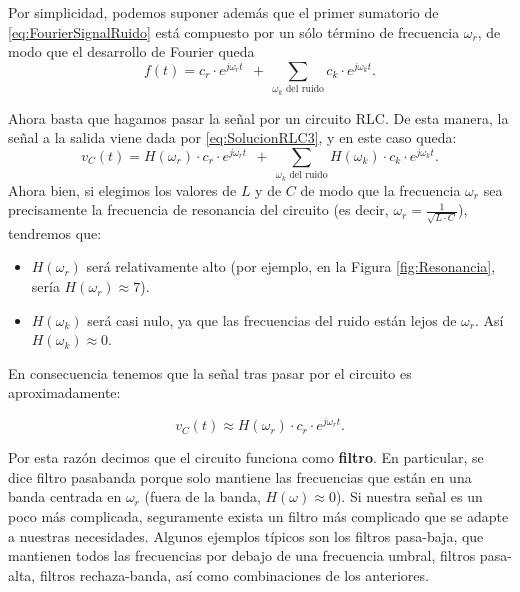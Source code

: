 Por simplicidad, podemos suponer además que el primer sumatorio de \eqref{eq:FourierSignalRuido} está compuesto por un sólo término de frecuencia $\omega_r$, de modo que el desarrollo de Fourier queda
\begin{equation}
  \label{eq:FourierSignalRuido}
  f(t) = c_r \cdot e^{j\omega_r t}\ \ +\  \sum_{\omega_k\text{ del ruido}}\!\!\!\!\!c_k \cdot e^{j\omega_k t}.
\end{equation}

Ahora basta que hagamos pasar la señal por un circuito RLC. De esta manera, la señal a la salida viene dada por \eqref{eq:SolucionRLC3}, y en este caso queda:
\begin{equation}
  \label{eq:FourierSignalFiltrada1}
  v_C(t) = H(\omega_r) \cdot c_r \cdot e^{j\omega_r t}\ \ +\  \sum_{\omega_k\text{ del ruido}}\!\!\!\!\! H(\omega_k)\cdot c_k\cdot e^{j\omega_k t}.
\end{equation}
 Ahora bien, si elegimos los valores de $L$ y de $C$ de modo que la frecuencia $\omega_r$ sea precisamente la frecuencia de resonancia del circuito (es decir, $\omega_r = \frac{1}{\sqrt{L\cdot C}}$), tendremos que:
 \begin{itemize}
 \item $H(\omega_r)$ será relativamente alto (por ejemplo, en la Figura \ref{fig:Resonancia}, sería $H(\omega_r)\approx 7$).
 \item $H(\omega_k)$ será casi nulo, ya que las frecuencias del ruido están lejos de $\omega_r$. Así  $H(\omega_k)\approx 0$.
 \end{itemize}
En consecuencia tenemos que la señal tras pasar por el circuito es aproximadamente:
\begin{mybox}\vspace{-15pt}
  \begin{equation}
    \label{eq:FourierSignalFiltrada}
    v_C(t) \approx H(\omega_r) \cdot c_r \cdot e^{j\omega_r t}.
  \end{equation}
\end{mybox}

Por esta razón decimos que el circuito funciona como \textbf{filtro}. En particular, se dice filtro pasabanda porque solo mantiene las frecuencias que están en una banda centrada en $\omega_r$ (fuera de la banda, $H(\omega)\approx 0$). Si nuestra señal es un poco más complicada, seguramente exista un filtro más complicado que se adapte a nuestras necesidades. Algunos ejemplos típicos son los filtros pasa-baja, que mantienen todos las frecuencias por debajo de una frecuencia umbral, filtros pasa-alta, filtros rechaza-banda, así como combinaciones de los anteriores.





\newpage



